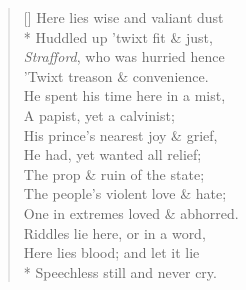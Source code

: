 \documentclass[MAIN]{subfiles}
\begin{document}
\settowidth{\versewidth}{Here lies wise and valiant dust}
\begin{verse}[\versewidth]
Here lies wise and valiant dust\\* 
Huddled up 'twixt fit \& just,\\
\emph{Strafford}, who was hurried hence\\
'Twixt treason \& convenience.\\
He spent his time here in a mist,\\
A papist, yet a calvinist;\\
His prince's nearest joy \& grief,\\
He had, yet wanted all relief;\\
The prop \& ruin of the state;\\
The people's violent love \& hate;\\
One in extremes loved \& abhorred.\\
Riddles lie here, or in a word,\\
Here lies blood; and let it lie\\*
Speechless still and never cry.
\end{verse}
\end{document}
